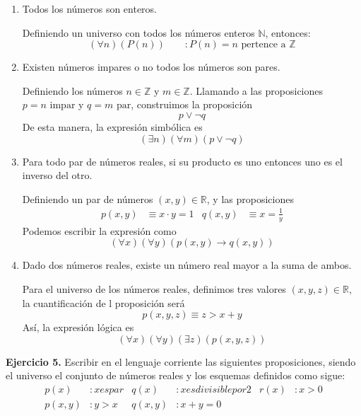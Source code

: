 \begin{enumerate}
	\item Todos los números son enteros.
	
	Definiendo un universo con todos los n\'umeros enteros $\mathbb{N}$, entonces:
	\begin{equation*}
		(\forall n)(P(n))\qquad : P(n) = n \text{ pertence a } \mathbb{Z}
	\end{equation*}

	\item Existen números impares o no todos los números son pares.
	
	Definiendo los n\'umeros $n \in \mathbb{Z}$ y $m \in \mathbb{Z}$. Llamando a las proposiciones $p = n \text{ impar}$ y $q = m \text{ par}$, construimos la proposici\'on $$p \vee \neg q$$ De esta manera, la expresi\'on simb\'olica es $$(\exists n)(\forall m)(p \vee \neg q)$$
	
	\item Para todo par de números reales, si su producto es uno entonces uno es el inverso del otro.
	
	Definiendo un par de n\'umeros $(x,y) \in \mathbb{R}$, y las proposiciones
	\begin{align*}
		p(x,y) &\equiv x \cdot y = 1 & q(x,y) &\equiv x = \frac{1}{y} 
	\end{align*}
	Podemos escribir la expresi\'on como $$(\forall x)(\forall y)(p(x,y) \rightarrow q(x,y))$$
	
	\item Dado dos números reales, existe un número real mayor a la suma de ambos.
	
	Para el universo de los n\'umeros reales, definimos tres valores $(x,y,z) \in \mathbb{R}$, la cuantificaci\'on de l proposici\'on ser\'a $$p(x,y,z) \equiv z > x+y$$ As\'i, la expresi\'on l\'ogica es $$(\forall x)(\forall y)(\exists z)(p(x,y,z))$$
\end{enumerate}

\textbf{Ejercicio 5.} Escribir en el lenguaje corriente las siguientes proposiciones, siendo el universo el conjunto de números
reales y los esquemas definidos como sigue:
\begin{align*}
	p(x)&: x es par & q(x)&: x es divisible por 2 & r(x)&: x> 0\\
	p(x,y)&: y > x & q(x,y)&: x + y = 0
\end{align*}

